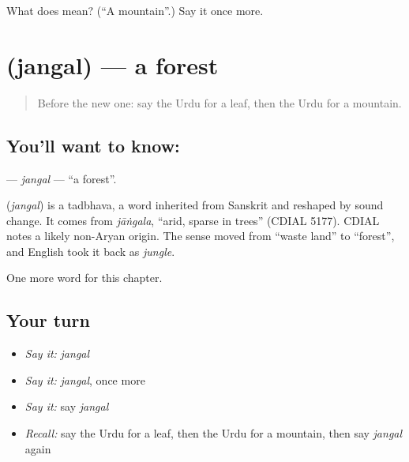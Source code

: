 \begin{tcolorbox}[breakable,colback=teal!4,colframe=teal!35!black,title={Before you move on}]
What does  mean? (\textquotedblleft{}A mountain\textquotedblright{}.) Say it once more.
\end{tcolorbox}
\section[\texorpdfstring{\ur{جنگل} (jangal)}{جنگل (jangal)}]{ (jangal) — a forest}

\label{lesson:UR-C64-jangal}



\begin{quote}
Before the new one: say the Urdu for a leaf, then the Urdu for a mountain.
\end{quote}

\subsection*{You'll want to know: }
\textbf{} — \emph{jangal} — \textquotedblleft{}a forest\textquotedblright{}.

\begin{cousinweb}
\textbf{} (\emph{jangal}) is a tadbhava, a word inherited from Sanskrit and reshaped by sound change. It comes from \emph{jāṅgala}, \textquotedblleft{}arid, sparse in trees\textquotedblright{} (CDIAL 5177). CDIAL notes a likely non-Aryan origin. The sense moved from \textquotedblleft{}waste land\textquotedblright{} to \textquotedblleft{}forest\textquotedblright{}, and English took it back as \emph{jungle}.
\end{cousinweb}

\begin{grammarlens}[title={What you've built}]
One more word for this chapter.
\end{grammarlens}

\subsection*{Your turn}
\begin{itemize}
\raggedright
  \item \emph{Say it:} \emph{jangal}
  \item \emph{Say it:} \emph{jangal}, once more
  \item \emph{Say it:} say \emph{jangal}
  \item \emph{Recall:} say the Urdu for a leaf, then the Urdu for a mountain, then say \emph{jangal} again
\end{itemize}


